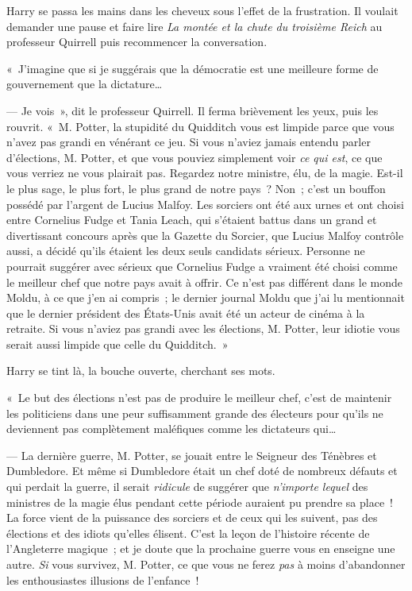 Harry se passa les mains dans les cheveux sous l'effet de la frustration. Il voulait demander une pause et faire lire \emph{La montée et la chute du troisième Reich} au professeur Quirrell puis recommencer la conversation.

«~J'imagine que si je suggérais que la démocratie est une meilleure forme de gouvernement que la dictature…

--- Je vois~», dit le professeur Quirrell. Il ferma brièvement les yeux, puis les rouvrit. «~M. Potter, la stupidité du Quidditch vous est limpide parce que vous n'avez pas grandi en vénérant ce jeu. Si vous n'aviez jamais entendu parler d'élections, M. Potter, et que vous pouviez simplement voir \emph{ce qui est}, ce que vous verriez ne vous plairait pas. Regardez notre ministre, élu, de la magie. Est-il le plus sage, le plus fort, le plus grand de notre pays~? Non~; c'est un bouffon possédé par l'argent de Lucius Malfoy. Les sorciers ont été aux urnes et ont choisi entre Cornelius Fudge et Tania Leach, qui s'étaient battus dans un grand et divertissant concours après que la Gazette du Sorcier, que Lucius Malfoy contrôle aussi, a décidé qu'ils étaient les deux seuls candidats sérieux. Personne ne pourrait suggérer avec sérieux que Cornelius Fudge a vraiment été choisi comme le meilleur chef que notre pays avait à offrir. Ce n'est pas différent dans le monde Moldu, à ce que j'en ai compris~; le dernier journal Moldu que j'ai lu mentionnait que le dernier président des États-Unis avait été un acteur de cinéma à la retraite. Si vous n'aviez pas grandi avec les élections, M. Potter, leur idiotie vous serait aussi limpide que celle du Quidditch.~»

Harry se tint là, la bouche ouverte, cherchant ses mots.

«~Le but des élections n'est pas de produire le meilleur chef, c'est de maintenir les politiciens dans une peur suffisamment grande des électeurs pour qu'ils ne deviennent pas complètement maléfiques comme les dictateurs qui…

--- La dernière guerre, M. Potter, se jouait entre le Seigneur des Ténèbres et Dumbledore. Et même si Dumbledore était un chef doté de nombreux défauts et qui perdait la guerre, il serait \emph{ridicule} de suggérer que \emph{n'importe lequel} des ministres de la magie élus pendant cette période auraient pu prendre sa place~! La force vient de la puissance des sorciers et de ceux qui les suivent, pas des élections et des idiots qu'elles élisent. C'est la leçon de l'histoire récente de l'Angleterre magique~; et je doute que la prochaine guerre vous en enseigne une autre. \emph{Si} vous survivez, M. Potter, ce que vous ne ferez \emph{pas} à moins d'abandonner les enthousiastes illusions de l'enfance~!

